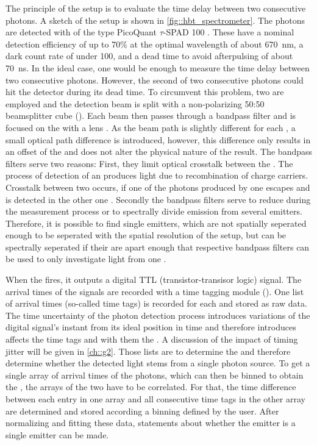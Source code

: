 		The principle of the \hbt setup is to evaluate the time delay between two consecutive photons. 
		A sketch of the \hbt setup is shown in \autoref{fig::hbt_spectrometer}.
		The photons are detected with \apds of the type PicoQuant $\tau${}-SPAD 100 .
		These \apds have a nominal detection efficiency of up to 70\% at the optimal wavelength of about \SI{670}{\nm}, a dark count rate of under \SI{100}{\cps}, and a dead time to avoid afterpulsing of about \SI{70}{\ns}.
		In the ideal case, one \APD would be enough to measure the time delay between two consecutive photons. 
		However, the second of two consecutive photons could hit the detector during its dead time.
		To circumvent this problem, two \APDs are employed and the detection beam is split with a non-polarizing 50:50 beamsplitter cube ().
		Each beam then passes through a bandpass filter and is focused on the \apd with a lens .
		As the beam path is slightly different for each \APD, a small optical path difference is introduced, however, this difference only results in an offset of the \gtf and does not alter the physical nature of the result.
		The bandpass filters serve two reasons:
		First, they limit optical crosstalk between the \apds. 
		The process of detection of an \apd produces light due to recombination of charge carriers. 
		Crosstalk between two \apds occurs, if one of the photons produced by one \apd escapes and is detected in the other one \cite{Younger2009}.  
		Secondly the bandpass filters serve to reduce \bkg during the \gt measurement process or to spectrally divide emission from several emitters.
		Therefore, it is possible to find single emitters, which are not spatially seperated enough to be seperated with the spatial resolution of the setup, but can be spectrally seperated if their \ZPLs are apart enough that respective bandpass filters can be used to only investigate light from one \ZPL.

		When the \APD fires, it outputs a digital TTL (transistor-transisor logic) signal. 
		The arrival times of the signals are recorded with a time tagging module ().
		One list of arrival times (so-called time tags) is recorded for each \APD and stored as raw data.
		The time uncertainty of the photon detection process introduces variations of the digital signal's instant from its ideal position in time and therefore introduces affects the time tags and with them the \gtf.
		A discussion of the impact of timing jitter will be given in \autoref{ch::g2}. 
		Those lists are to determine the \gtf and therefore determine whether the detected light stems from a single photon source.
		To get a single array of arrival times of the photons, which can then be binned to obtain the \gtf, the arrays of the two \APDs have to be correlated.
		For that, the time difference between each entry in one array and all consecutive time tags in the other array are determined and stored according a binning defined by the user.
		After normalizing and fitting these data, statements about whether the emitter is a single emitter can be made.





